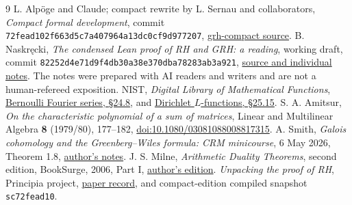 \documentclass[11pt,a4paper]{article}
\theoremstyle{definition}
\begin{document}
\begin{thebibliography}{9}
L. Alp\"oge and Claude; compact rewrite by L. Sernau and collaborators,
\emph{Compact formal development}, commit
\texttt{72fead102f663d5c7a407964a13dc0cf9d977207},
\href{https://github.com/lsernau/grh-lean/tree/72fead102f663d5c7a407964a13dc0cf9d977207/grh-compact}{grh-compact source}.
B. Naskr\k{e}cki, \emph{The condensed Lean proof of RH and GRH: a reading},
working draft, commit \texttt{82252d4e71d9f4db30a38e370dba78283ab3a921},
\href{https://github.com/nasqret/riemann-rev/tree/82252d4e71d9f4db30a38e370dba78283ab3a921/writeup}{source and individual notes}.
The notes were prepared with AI readers and writers and are not a
human-refereed exposition.
NIST, \emph{Digital Library of Mathematical Functions},
\href{https://dlmf.nist.gov/24.8}{Bernoulli Fourier series, \S24.8},
and \href{https://dlmf.nist.gov/25.15}{Dirichlet \(L\)-functions, \S25.15}.
S. A. Amitsur, \emph{On the characteristic polynomial of a sum of matrices},
Linear and Multilinear Algebra \textbf{8} (1979/80), 177--182,
\href{https://doi.org/10.1080/03081088008817315}{doi:10.1080/03081088008817315}.
A. Smith, \emph{Galois cohomology and the Greenberg--Wiles formula:
CRM minicourse}, 6 May 2026, Theorem 1.8,
\href{https://www.asmith-math.org/CRMnotes.pdf}{author's notes}.
J. S. Milne, \emph{Arithmetic Duality Theorems}, second edition,
BookSurge, 2006, Part I,
\href{https://www.jmilne.org/math/Books/ADT.pdf}{author's edition}.
\emph{Unpacking the proof of RH}, Principia project,
\href{https://principia-math.com/projects/d16ab288ed353bc5b10e292ace0ddbc1/paper}{paper record},
and compact-edition compiled snapshot \texttt{sc72fead10}.
\end{thebibliography}
\end{document}
